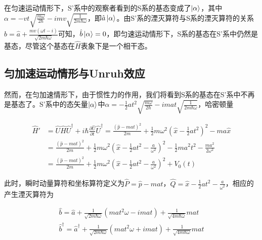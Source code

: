 \documentclass[a4paper]{article}
\begin{document}
            在匀速运动情形下，S'系中的观察者看到的S系的基态变成了$\ket{\alpha}$，其中$\alpha=-vt\sqrt{\frac{m\omega}{2\hbar}}-imv\sqrt{\frac{1}{2m\hbar\omega}}$，即$\hat{a}\ket{\alpha}$。由S'系的湮灭算符与S系的湮灭算符的关系$\hat{b}=\hat{a}+\frac{mv(\omega t-i)}{\sqrt{2m\hbar\omega}}$可知，$\hat{b}\ket{\alpha}=0$，即匀速运动情形下，S系的基态在S'系中仍然是基态，尽管这个基态在$\hat{H}$表象下是一个相干态。


        \subsection{匀加速运动情形与Unruh效应}

            然而，在匀加速情形下，由于惯性力的作用，我们将看到S系的基态在S'系中不再是基态了。S'系中的态矢量$\ket{\alpha}$中$\alpha=-\frac{1}{2}at^2\sqrt{\frac{m\omega}{2\hbar}}-imat\sqrt{\frac{1}{2m\hbar\omega}}$，哈密顿量
            
            \begin{equation}
                \begin{split}
                    \hat{H}' &= \hat{U}\hat{H}\hat{U}^\dagger+i\hbar\frac{\partial\hat{U}}{\partial t}\hat{U}^\dagger = \frac{(\hat{p}-mat)^2}{2m}+\frac{1}{2}m\omega^2(\hat{x}-\frac{1}{2}at^2)^2-ma\hat{x} \\
                        &= \frac{(\hat{p}-mat)^2}{2m}+\frac{1}{2}m\omega^2(\hat{x}-\frac{1}{2}at^2-\frac{a}{\omega^2})^2-\frac{1}{2}ma^2t^2-\frac{ma^2}{2\omega^2}　\\
                        &= \frac{(\hat{p}-mat)^2}{2m}+\frac{1}{2}m\omega^2(\hat{x}-\frac{1}{2}at^2-\frac{a}{\omega^2})^2+V_0(t)
                \end{split}
            \end{equation}
                
            此时，瞬时动量算符和坐标算符定义为$\hat{P}=\hat{p}-mat$，$\hat{Q}=\hat{x}-\frac{1}{2}at^2-\frac{a}{\omega^2}$，相应的产生湮灭算符为

            \begin{equation}
                \begin{array}{lr}
                    \hat{b}=\hat{a}+\frac{1}{\sqrt{2m\hbar\omega}}(mat^2\omega-imat)+\frac{1}{\sqrt{4m\hbar\omega}}mat \\
                    \hat{b}^\dagger=\hat{a}^\dagger+\frac{1}{\sqrt{2m\hbar\omega}}(mat^2\omega+imat)+\frac{1}{\sqrt{4m\hbar\omega}}mat
                \end{array}
            \end{equation}
\end{document}

